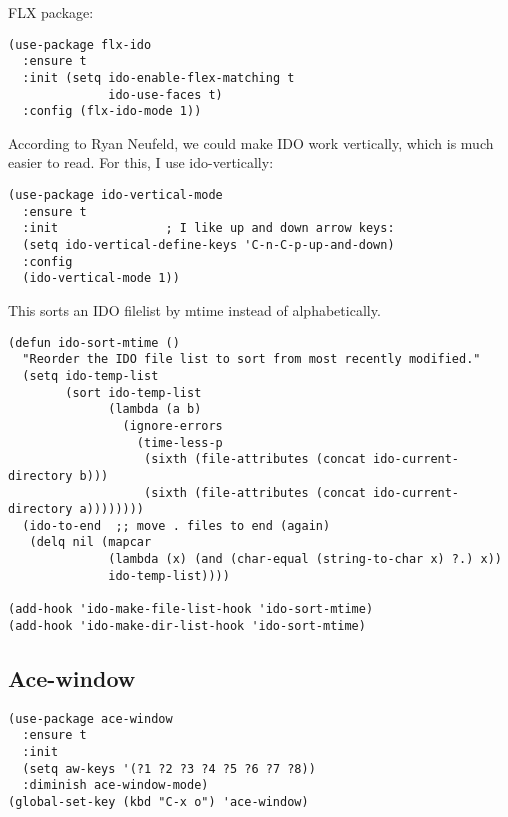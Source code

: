 \documentclass[12pt]{article}
\begin{document}
FLX package:

\lstset{language=Lisp,label= ,caption= ,captionpos=b,numbers=none}
\begin{lstlisting}
(use-package flx-ido
  :ensure t
  :init (setq ido-enable-flex-matching t
              ido-use-faces t)
  :config (flx-ido-mode 1))
\end{lstlisting}

According to Ryan Neufeld, we could make IDO work vertically, which is much easier to read. For this, I use ido-vertically:

\lstset{language=Lisp,label= ,caption= ,captionpos=b,numbers=none}
\begin{lstlisting}
(use-package ido-vertical-mode
  :ensure t
  :init               ; I like up and down arrow keys:
  (setq ido-vertical-define-keys 'C-n-C-p-up-and-down)
  :config
  (ido-vertical-mode 1))

\end{lstlisting}

This sorts an IDO filelist by mtime instead of alphabetically.

\lstset{language=Lisp,label= ,caption= ,captionpos=b,numbers=none}
\begin{lstlisting}
(defun ido-sort-mtime ()
  "Reorder the IDO file list to sort from most recently modified."
  (setq ido-temp-list
        (sort ido-temp-list
              (lambda (a b)
                (ignore-errors
                  (time-less-p
                   (sixth (file-attributes (concat ido-current-directory b)))
                   (sixth (file-attributes (concat ido-current-directory a))))))))
  (ido-to-end  ;; move . files to end (again)
   (delq nil (mapcar
              (lambda (x) (and (char-equal (string-to-char x) ?.) x))
              ido-temp-list))))

(add-hook 'ido-make-file-list-hook 'ido-sort-mtime)
(add-hook 'ido-make-dir-list-hook 'ido-sort-mtime)
\end{lstlisting}

\subsection{Ace-window}
\label{sec:org9826606}

\lstset{language=Lisp,label= ,caption= ,captionpos=b,numbers=none}
\begin{lstlisting}
(use-package ace-window
  :ensure t
  :init
  (setq aw-keys '(?1 ?2 ?3 ?4 ?5 ?6 ?7 ?8))
  :diminish ace-window-mode)
(global-set-key (kbd "C-x o") 'ace-window)

\end{lstlisting}
\end{document}
